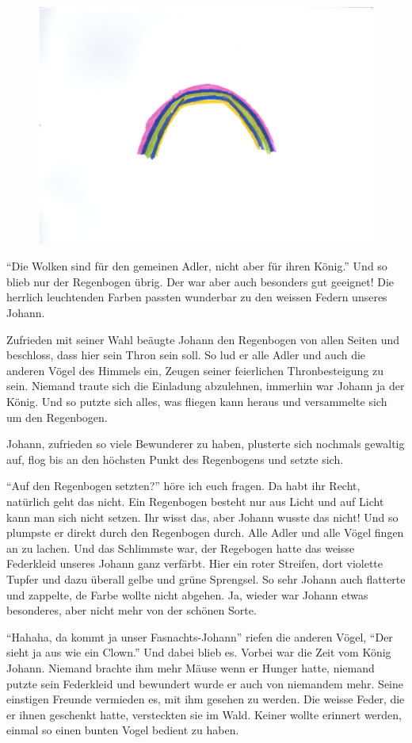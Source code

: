 \begin{figure}[hb]
\centering
\includegraphics[width=.7\textwidth]{bilder/adler.pdf}
\end{figure}

\enquote{Die Wolken sind für den gemeinen Adler, nicht aber für ihren König.} Und so blieb nur der Regenbogen übrig. Der war aber auch besonders gut geeignet! Die herrlich leuchtenden Farben passten wunderbar zu den weissen Federn unseres Johann. 

Zufrieden mit seiner Wahl beäugte Johann den Regenbogen von allen Seiten und beschloss, dass hier sein Thron sein soll. So lud er alle Adler und auch die anderen Vögel des Himmels ein, Zeugen seiner feierlichen Thronbesteigung zu sein. Niemand traute sich die Einladung abzulehnen, immerhin war Johann ja der König. Und so putzte sich alles, was fliegen kann heraus und versammelte sich um den Regenbogen.

Johann, zufrieden so viele Bewunderer zu haben, plusterte sich nochmals gewaltig auf, flog bis an den höchsten Punkt des Regenbogens und setzte sich.

\enquote{Auf den Regenbogen setzten?} höre ich euch fragen. Da habt ihr Recht, natürlich geht das nicht. Ein Regenbogen besteht nur aus Licht und auf Licht kann man sich nicht setzen. Ihr wisst das, aber Johann wusste das nicht! Und so plumpste er direkt durch den Regenbogen durch. Alle Adler und alle Vögel fingen an zu lachen. Und das Schlimmste war, der Regebogen hatte das weisse Federkleid unseres Johann ganz verfärbt. Hier ein roter Streifen, dort violette Tupfer und dazu überall gelbe und grüne Sprengsel. So sehr Johann auch flatterte und zappelte, de Farbe wollte nicht abgehen. Ja, wieder war Johann etwas besonderes, aber nicht mehr von der schönen Sorte.

\enquote{Hahaha, da kommt ja unser Fasnachts-Johann} riefen die anderen Vögel, \enquote{Der sieht ja aus wie ein Clown.} Und dabei blieb es. Vorbei war die Zeit vom König Johann. Niemand brachte ihm mehr Mäuse wenn er Hunger hatte, niemand putzte sein Federkleid und bewundert wurde er auch von niemandem mehr. Seine einstigen Freunde vermieden es, mit ihm gesehen zu werden. Die weisse Feder, die er ihnen geschenkt hatte, versteckten sie im Wald. Keiner wollte erinnert werden, einmal so einen bunten Vogel bedient zu haben. 

